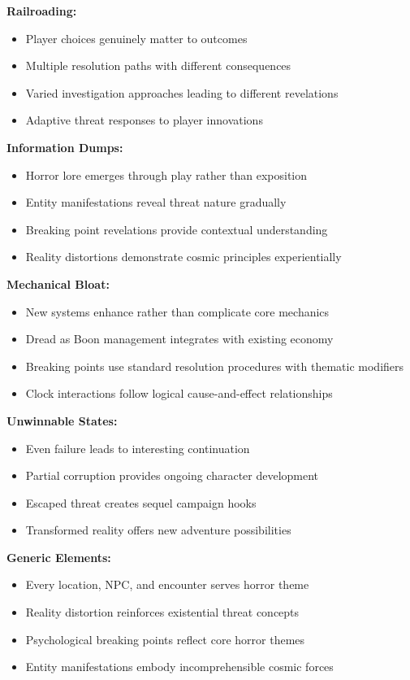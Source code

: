 \documentclass[11pt]{article}
\begin{document}
\textbf{Railroading:}
\begin{itemize}
\item Player choices genuinely matter to outcomes
\item Multiple resolution paths with different consequences
\item Varied investigation approaches leading to different revelations
\item Adaptive threat responses to player innovations
\end{itemize}

\textbf{Information Dumps:}
\begin{itemize}
\item Horror lore emerges through play rather than exposition
\item Entity manifestations reveal threat nature gradually
\item Breaking point revelations provide contextual understanding
\item Reality distortions demonstrate cosmic principles experientially
\end{itemize}

\textbf{Mechanical Bloat:}
\begin{itemize}
\item New systems enhance rather than complicate core mechanics
\item Dread as Boon management integrates with existing economy
\item Breaking points use standard resolution procedures with thematic modifiers
\item Clock interactions follow logical cause-and-effect relationships
\end{itemize}

\textbf{Unwinnable States:}
\begin{itemize}
\item Even failure leads to interesting continuation
\item Partial corruption provides ongoing character development
\item Escaped threat creates sequel campaign hooks
\item Transformed reality offers new adventure possibilities
\end{itemize}

\textbf{Generic Elements:}
\begin{itemize}
\item Every location, NPC, and encounter serves horror theme
\item Reality distortion reinforces existential threat concepts
\item Psychological breaking points reflect core horror themes
\item Entity manifestations embody incomprehensible cosmic forces
\end{itemize}
\end{document}

